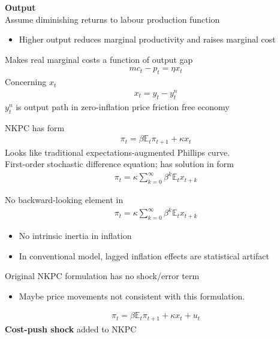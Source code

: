 \documentclass{beamer}
\begin{document}
\begin{frame}
  \textbf{Output}\\
  Assume diminishing returns to labour production function
  \begin{itemize}
    \item Higher output reduces marginal productivity and raises marginal cost 
  \end{itemize}
  \medskip
  Makes real marginal costs a function of output gap  
\begin{align}
  mc_t-p_t=\eta x_t
\end{align}
Concerning $x_t$
\begin{align}
  x_t=y_t-y_t^n
\end{align}
$y_t^n$ is output path in zero-inflation price friction free economy
\end{frame}

\begin{frame}
 NKPC has form
  \begin{align}
  \pi_t=\beta \mathbb{E}_t \pi_{t+1} + \kappa x_t
\end{align}
\medskip
 Looks like traditional expectations-augmented Phillips curve.\\
 First-order stochastic difference equation; has solution in form
\begin{align}  
  \pi_t=\kappa \sum_{k=0}^{\infty}\beta^k \mathbb{E}_t x_{t+k} 
\end{align}
\end{frame}

\begin{frame}
 No backward-looking element in
\begin{align}  
  \pi_t=\kappa \sum_{k=0}^{\infty}\beta^k \mathbb{E}_t x_{t+k} 
\end{align}
\begin{itemize}
  \item No intrinsic inertia in inflation
  \item In conventional model, lagged inflation effects are statistical artifact
\end{itemize}
\medskip
 Original NKPC formulation has no shock/error term
\begin{itemize}
  \item Maybe price movements not consistent with this formulation.
\end{itemize}
\begin{align}
  \pi_t=\beta \mathbb{E}_t \pi_{t+1} + \kappa x_t + u_t
\end{align} 
\medskip
 \textbf{Cost-push shock} added to NKPC
\end{frame}
\end{document}
